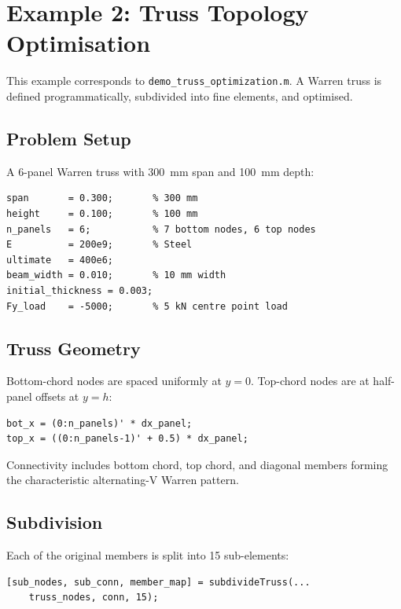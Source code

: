 \section{Example 2: Truss Topology Optimisation}
\label{sec:ex:truss}

This example corresponds to \texttt{demo\_truss\_optimization.m}.  A Warren
truss is defined programmatically, subdivided into fine elements, and
optimised.

\subsection{Problem Setup}

A 6-panel Warren truss with 300~mm span and 100~mm depth:

\begin{lstlisting}[caption={Truss parameters.}]
span       = 0.300;       % 300 mm
height     = 0.100;       % 100 mm
n_panels   = 6;           % 7 bottom nodes, 6 top nodes
E          = 200e9;       % Steel
ultimate   = 400e6;
beam_width = 0.010;       % 10 mm width
initial_thickness = 0.003;
Fy_load    = -5000;       % 5 kN centre point load
\end{lstlisting}

\subsection{Truss Geometry}

Bottom-chord nodes are spaced uniformly at $y = 0$.  Top-chord nodes are at
half-panel offsets at $y = h$:

\begin{lstlisting}[caption={Warren truss node placement.}]
bot_x = (0:n_panels)' * dx_panel;
top_x = ((0:n_panels-1)' + 0.5) * dx_panel;
\end{lstlisting}

Connectivity includes bottom chord, top chord, and diagonal members forming
the characteristic alternating-V Warren pattern.

\subsection{Subdivision}

Each of the original members is split into 15 sub-elements:

\begin{lstlisting}[caption={Truss subdivision.}]
[sub_nodes, sub_conn, member_map] = subdivideTruss(...
    truss_nodes, conn, 15);
\end{lstlisting}

